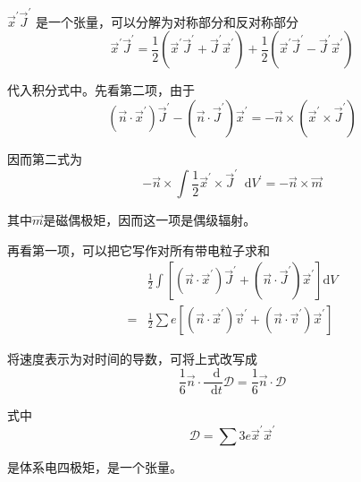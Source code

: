 \documentclass[UTF8]{ctexart}
\newcommand*{\dif}{\mathop{}\!\mathrm{d}}
\begin{document}
\noindent $\vec{x}^{\prime} \vec{J}^{\prime}$ 是一个张量，可以分解为对称部分和反对称部分
\begin{equation}
    \vec{x}^{\prime} \vec{J}^{\prime} = \frac{1}{2} (\vec{x}^{\prime} \vec{J}^{\prime} + \vec{J}^{\prime} \vec{x}^{\prime}) + \frac{1}{2} (\vec{x}^{\prime} \vec{J}^{\prime} - \vec{J}^{\prime} \vec{x}^{\prime})
\end{equation}

\noindent 代入积分式中。先看第二项，由于
\begin{equation}
    \left(\vec{n} \cdot \vec{x}^{\prime}\right) \vec{J}^{\prime}-\left(\vec{n} \cdot \vec{J}^{\prime}\right) \vec{x}^{\prime}=-\vec{n} \times\left(\vec{x}^{\prime} \times \vec{J}^{\prime}\right)
\end{equation}

\noindent 因而第二式为
\begin{equation}
    - \vec{n} \times \int \frac{1}{2} \vec{x}^{\prime} \times \vec{J}^{\prime} \dif V^{\prime} = - \vec{n} \times \vec{m} \label{equ5.11}
\end{equation}

\noindent 其中$\vec{m}$是磁偶极矩，因而这一项是偶级辐射。

    再看第一项，可以把它写作对所有带电粒子求和
    \begin{equation}
    \begin{aligned} & \frac{1}{2} \int\left[\left(\vec{n} \cdot \vec{x}^{\prime}\right) \vec{J}^{\prime}+\left(\vec{n} \cdot \vec{J}^{\prime}\right) \vec{x}^{\prime}\right] \mathrm{d} V \\=& \frac{1}{2} \sum e\left[\left(\vec{n} \cdot \vec{x}^{\prime}\right) \vec{v}^{\prime}+\left(\vec{n} \cdot \vec{v}^{\prime}\right) \vec{x}^{\prime}\right] \end{aligned}
    \end{equation}

\noindent 将速度表示为对时间的导数，可将上式改写成
\begin{equation}
    \frac{1}{6} \vec{n} \cdot \frac{\dif }{\dif t} \mathbf{\mathscr{D}}  = \frac{1}{6} \vec{n} \cdot \mathbf{\mathscr{D}} \label{equ5.12}
\end{equation}

\noindent 式中 
\begin{equation}
    \mathbf{\mathscr{D}} = \sum 3e \vec{x}^{\prime} \vec{x}^{\prime}
\end{equation}

\noindent 是体系电四极矩，是一个张量。
\end{document}
